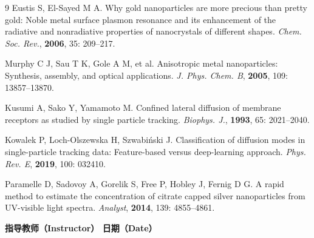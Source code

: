 \documentclass[a4paper]{article}
\newcommand{\zihaoWu}{\fontsize{10.5pt}{16pt}\selectfont}
\begin{document}
\vspace{3em}
{\footnotesize
  \begin{thebibliography}{9}
    Eustis S, El-Sayed M A. Why gold nanoparticles are more precious than pretty gold: Noble metal surface plasmon resonance and its enhancement of the radiative and nonradiative properties of nanocrystals of different shapes. \textit{Chem. Soc. Rev.}, \textbf{2006}, 35: 209--217.

    Murphy C J, Sau T K, Gole A M, et al. Anisotropic metal nanoparticles: Synthesis, assembly, and optical applications. \textit{J. Phys. Chem. B}, \textbf{2005}, 109: 13857--13870.

    Kusumi A, Sako Y, Yamamoto M. Confined lateral diffusion of membrane receptors as studied by single particle tracking. \textit{Biophys. J.}, \textbf{1993}, 65: 2021--2040.

    Kowalek P, Loch-Olszewska H, Szwabiński J. Classification of diffusion modes in single-particle tracking data: Feature-based versus deep-learning approach. \textit{Phys. Rev. E}, \textbf{2019}, 100: 032410.

    Paramelle D, Sadovoy A, Gorelik S, Free P, Hobley J, Fernig D G. A rapid method to estimate the concentration of citrate capped silver nanoparticles from UV-visible light spectra. \textit{Analyst}, \textbf{2014}, 139: 4855--4861.
  \end{thebibliography}
}

\vspace*{\fill}
\noindent{\zihaoWu 评语（Remarks）：}

\vspace{2em}

\begin{center}
  {\zihaoWu\bfseries 指导教师（Instructor）\hspace{8em} 日期（Date）}
\end{center}

\vspace{1.5cm}
\end{document}
